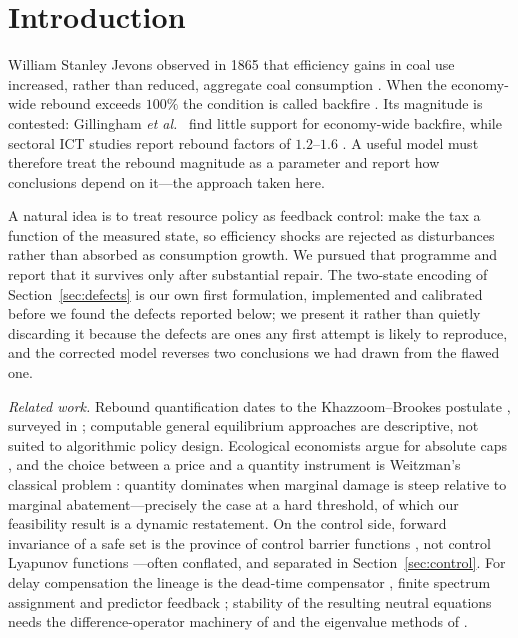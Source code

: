 \documentclass[conference,letterpaper,10pt]{IEEEtran}
\theoremstyle{plain}
\theoremstyle{remark}
\begin{document}
\section{Introduction}
William Stanley Jevons observed in 1865 that efficiency gains in coal
use increased, rather than reduced, aggregate coal consumption
\cite{jevons1865}. When the economy-wide rebound exceeds $100\%$ the
condition is called backfire \cite{khazzoom1980,brookes1990,
saunders2008}. Its magnitude is contested: Gillingham \emph{et
al.}~\cite{gillingham2016} find little support for economy-wide
backfire, while sectoral ICT studies report rebound factors of
$1.2$--$1.6$ \cite{sorrell2007,coroama2019}. A useful model must
therefore treat the rebound magnitude as a parameter and report how
conclusions depend on it---the approach taken here.

A natural idea is to treat resource policy as feedback control: make
the tax a function of the measured state, so efficiency shocks are
rejected as disturbances rather than absorbed as consumption growth.
We pursued that programme and report that it survives only after
substantial repair. The two-state encoding of Section~\ref{sec:defects}
is our own first formulation, implemented and calibrated before we
found the defects reported below; we present it rather than quietly
discarding it because the defects are ones any first attempt is likely
to reproduce, and the corrected model reverses two conclusions we had
drawn from the flawed one.

\emph{Related work.} Rebound quantification dates to the
Khazzoom--Brookes postulate \cite{khazzoom1980,brookes1990}, surveyed
in \cite{sorrell2009,gillingham2016}; computable general equilibrium
approaches are descriptive, not suited to algorithmic policy design.
Ecological economists argue for absolute caps \cite{rockstrom2009},
and the choice between a price and a quantity instrument is
Weitzman's classical problem \cite{weitzman1974}: quantity dominates
when marginal damage is steep relative to marginal
abatement---precisely the case at a hard threshold, of which our
feasibility result is a dynamic restatement. On the control side,
forward invariance of a safe set is the province of control barrier
functions \cite{ames2017}, not control Lyapunov functions
\cite{kokotovic2001}---often conflated, and separated in
Section~\ref{sec:control}. For delay compensation the lineage is the
dead-time compensator \cite{smith1957}, finite spectrum assignment
\cite{manitius1979} and predictor feedback \cite{krstic2009}; stability
of the resulting neutral equations needs the difference-operator
machinery of \cite{hale1993} and the eigenvalue methods of
\cite{michiels2007}.
\end{document}
